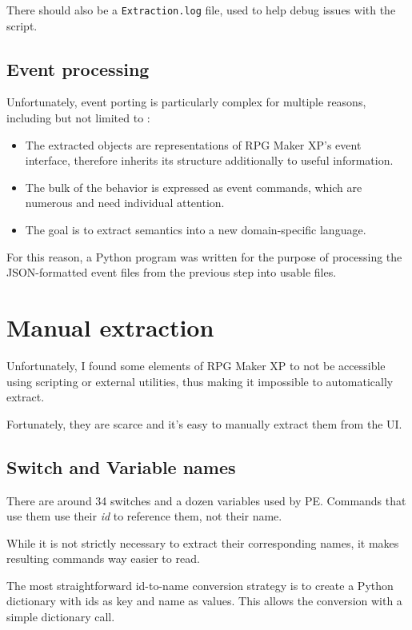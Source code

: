 \documentclass[11pt]{article}
\begin{document}
There should also be a \verb|Extraction.log| file, used to help debug issues with the script.



\subsection{Event processing}

Unfortunately, event porting is particularly complex for multiple reasons, including but not limited to :
\begin{itemize}
	\item The extracted objects are representations of RPG Maker XP's event interface, therefore inherits its structure additionally to useful information.
	
	\item The bulk of the behavior is expressed as event commands, which are numerous and need individual attention.
	
	\item The goal is to extract semantics into a new domain-specific language.
\end{itemize}

For this reason, a Python program was written for the purpose of processing the JSON-formatted event files from the previous step into usable files.




\newpage
\section{Manual extraction}

Unfortunately, I found some elements of RPG Maker XP to not be accessible using scripting or external utilities, thus making it impossible to automatically extract.

Fortunately, they are scarce and it's easy to manually extract them from the UI.

\subsection{Switch and Variable names}

There are around 34 switches and a dozen variables used by PE. Commands that use them use their \textit{id} to reference them, not their name.

While it is not strictly necessary to extract their corresponding names, it makes resulting commands way easier to read.

The most straightforward id-to-name conversion strategy is to create a Python dictionary with ids as key and name as values. This allows the conversion with a simple dictionary call.
\end{document}

